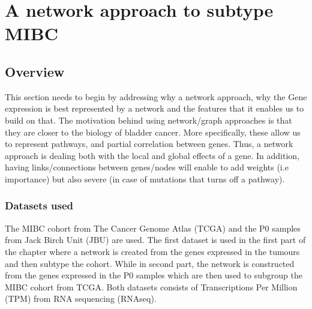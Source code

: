 \section{A network approach to subtype MIBC}


\vspace{3mm}
\vspace{3mm}


\subsection{Overview}

This section needs to begin by addressing why a network approach, why the Gene expression is best represented by a network and the features that it enables us to build on that.
% 
The motivation behind using network/graph approaches is that they are closer to the biology of bladder cancer. More specifically, these allow us to represent pathways, and partial correlation between genes. Thus, a network approach is dealing both with the local and global effects of a gene. In addition, having links/connections between genes/nodes will enable to add weights (i.e importance) but also severe (in case of mutations that turns off a pathway).


\subsubsection{Datasets used}

The MIBC cohort from The Cancer Genome Atlas (TCGA) \cite{Robertson2017-mg} and the P0 samples from Jack Birch Unit (JBU) are used. The first dataset is used in the first part of the chapter where a network is created from the genes expressed in the tumours and then subtype the cohort. While in second part, the network is constructed from the genes expressed in the P0 samples which are then used to subgroup the MIBC cohort from TCGA. Both datasets consists of Transcriptions Per Million (TPM) from RNA sequencing (RNAseq). 

